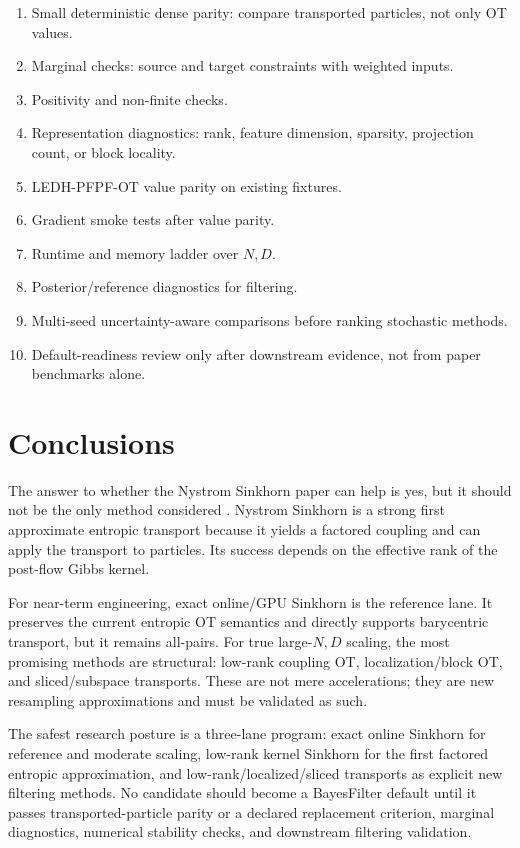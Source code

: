 \documentclass[11pt]{article}
\begin{document}
\begin{enumerate}[label=\arabic*.]
\item Small deterministic dense parity: compare transported particles, not only
OT values.
\item Marginal checks: source and target constraints with weighted inputs.
\item Positivity and non-finite checks.
\item Representation diagnostics: rank, feature dimension, sparsity, projection
count, or block locality.
\item LEDH-PFPF-OT value parity on existing fixtures.
\item Gradient smoke tests after value parity.
\item Runtime and memory ladder over $N,D$.
\item Posterior/reference diagnostics for filtering.
\item Multi-seed uncertainty-aware comparisons before ranking stochastic
methods.
\item Default-readiness review only after downstream evidence, not from paper
benchmarks alone.
\end{enumerate}

\section{Conclusions}

The answer to whether the Nystrom Sinkhorn paper  can help is
yes, but it should not be the only method considered
\citep{altschuler2019nystrom}.  Nystrom Sinkhorn is a
strong first approximate entropic transport because it yields a factored
coupling and can apply the transport to particles.  Its success depends on the
effective rank of the post-flow Gibbs kernel.

For near-term engineering, exact online/GPU Sinkhorn is the reference lane.  It
preserves the current entropic OT semantics and directly supports barycentric
transport, but it remains all-pairs.  For true large-$N,D$ scaling, the most
promising methods are structural: low-rank coupling OT, localization/block OT,
and sliced/subspace transports.  These are not mere accelerations; they are new
resampling approximations and must be validated as such.

The safest research posture is a three-lane program: exact online Sinkhorn for
reference and moderate scaling, low-rank kernel Sinkhorn for the first factored
entropic approximation, and low-rank/localized/sliced transports as explicit
new filtering methods.  No candidate should become a BayesFilter default until
it passes transported-particle parity or a declared replacement criterion,
marginal diagnostics, numerical stability checks, and downstream filtering
validation.
\end{document}
